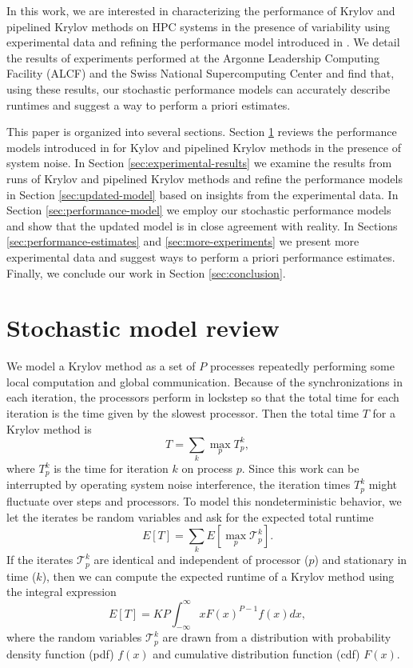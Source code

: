 \documentclass[num-refs]{wiley-article}
\begin{document}
In this work, we are interested in characterizing the performance of Krylov and pipelined Krylov methods on HPC systems in the presence of variability using experimental data and refining the performance model introduced in \cite{morgan2016krylov}.
We detail the results of experiments performed at the Argonne Leadership Computing Facility (ALCF) and the Swiss National Supercomputing Center and find that, using these results, our stochastic performance models can accurately describe runtimes and suggest a way to perform a priori estimates.

This paper is organized into several sections. Section \ref{sec:model-review} reviews the performance models introduced in \cite{morgan2016krylov} for Kylov and pipelined Krylov methods in the presence of system noise. In Section \ref{sec:experimental-results} we examine the results from runs of Krylov and pipelined Krylov methods and refine the performance models in Section \ref{sec:updated-model} based on insights from the experimental data.
In Section \ref{sec:performance-model} we employ our stochastic performance models and show that the updated model is in close agreement with reality.  In Sections \ref{sec:performance-estimates} and \ref{sec:more-experiments} we present more experimental data and suggest ways to perform a priori performance estimates.  Finally, we conclude our work in Section \ref{sec:conclusion}. 

\section{Stochastic model review} \label{sec:model-review}

We model a Krylov method as a set of $P$ processes repeatedly performing some local computation and global communication. Because of the synchronizations in each iteration, the processors perform in lockstep so that the total time for each iteration is the time given by the slowest processor. Then the total time $T$ for a Krylov method is
\begin{equation}
T = \sum_k \max_p T^k_p,
\end{equation}
where $T^k_p$ is the time for iteration $k$ on process $p$. Since this work can be interrupted by operating system noise interference, the iteration times $T^k_p$ might fluctuate over steps and processors. To model this nondeterministic behavior, we let the iterates be random variables and ask for the expected total runtime
\begin{equation}
E[T] = \sum_k E[ \max_p \mathcal{T}^k_p]. \label{eq:krylov-expression}
\end{equation}
If the iterates $\mathcal{T}^k_p$ are identical and independent of processor ($p$) and stationary in time ($k$), then we can compute the expected runtime of a Krylov method using the integral expression 
\begin{equation}
E[T] =  K P \int ^{\infty}_{-\infty} x F(x)^{P-1} f(x) dx \label{eq:krylov-model},
\end{equation}
where the random variables $\mathcal{T}^k_p$ are drawn from a distribution with probability density function (pdf) $f(x)$ and cumulative distribution function (cdf) $F(x)$. 
\end{document}
